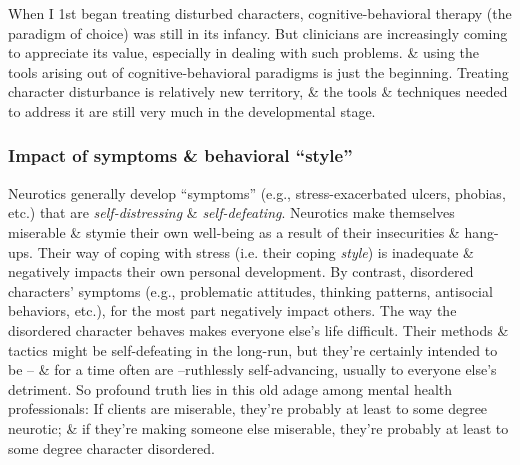 \documentclass{article}
\numberwithin{equation}{section}
\begin{document}
When I 1st began treating disturbed characters, cognitive-behavioral therapy (the paradigm of choice) was still in its infancy. But clinicians are increasingly coming to appreciate its value, especially in dealing with such problems. \& using the tools arising out of cognitive-behavioral paradigms is just the beginning. Treating character disturbance is relatively new territory, \& the tools \& techniques needed to address it are still very much in the developmental stage.

\subsubsection{Impact of symptoms \& behavioral ``style''}
Neurotics generally develop ``symptoms'' (e.g., stress-exacerbated ulcers, phobias, etc.) that are \textit{self-distressing} \& \textit{self-defeating}. Neurotics make themselves miserable \& stymie their own well-being as a result of their insecurities \& hang-ups. Their way of coping with stress (i.e. their coping \textit{style}) is inadequate \& negatively impacts their own personal development. By contrast, disordered characters' symptoms (e.g., problematic attitudes, thinking patterns, antisocial behaviors, etc.), for the most part negatively impact others. The way the disordered character behaves makes everyone else's life difficult. Their methods \& tactics might be self-defeating in the long-run, but they're certainly intended to be -- \& for a time often are --ruthlessly self-advancing, usually to everyone else's detriment. So profound truth lies in this old adage among mental health professionals: If clients are miserable, they're probably at least to some degree neurotic; \& if they're making someone else miserable, they're probably at least to some degree character disordered.
\end{document}
